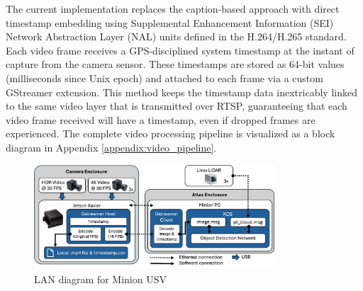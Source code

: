 \documentclass[../main.tex]{subfiles}
\begin{document}
The current implementation replaces the caption-based approach with direct timestamp embedding using Supplemental Enhancement Information (SEI) Network Abstraction Layer (NAL) units defined in the H.264/H.265 standard.
Each video frame receives a GPS-disciplined system timestamp at the instant of capture from the camera sensor. These timestamps are stored as 64-bit values (milliseconds since Unix epoch) and attached to each frame via a custom GStreamer extension. %
This method keeps the timestamp data inextricably linked to the same video layer that is transmitted over \ac{RTSP}, guaranteeing that each video frame received will have a timestamp, even if dropped frames are experienced.
The complete video processing pipeline is visualized as a block diagram in Appendix \ref{appendix:video_pipeline}.


\begin{figure}[htbp]
\centering
\includegraphics[width=0.8\textwidth]{Images/Block_Diagram.png}
\caption{LAN diagram for Minion USV}
\label{fig:sensor_block_diagram}
\end{figure}




\end{document}
